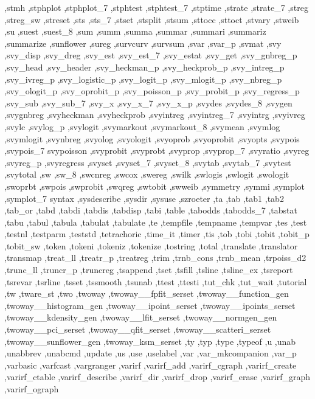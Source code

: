 {{    ,stmh ,stphplot ,stphplot_7 ,stphtest ,stphtest_7 ,stptime ,strate
    ,strate_7 ,streg ,streg_sw ,streset ,sts ,sts_7 ,stset ,stsplit
    ,stsum ,sttocc ,sttoct ,stvary ,stweib ,su ,suest ,suest_8 ,sum
    ,summ ,summa ,summar ,summari ,summariz ,summarize ,sunflower
    ,sureg ,survcurv ,survsum ,svar ,svar_p ,svmat ,svy ,svy_disp
    ,svy_dreg ,svy_est ,svy_est_7 ,svy_estat ,svy_get ,svy_gnbreg_p
    ,svy_head ,svy_header ,svy_heckman_p ,svy_heckprob_p ,svy_intreg_p
    ,svy_ivreg_p ,svy_logistic_p ,svy_logit_p ,svy_mlogit_p ,svy_nbreg_p
    ,svy_ologit_p ,svy_oprobit_p ,svy_poisson_p ,svy_probit_p
    ,svy_regress_p ,svy_sub ,svy_sub_7 ,svy_x ,svy_x_7 ,svy_x_p ,svydes
    ,svydes_8 ,svygen ,svygnbreg ,svyheckman ,svyheckprob ,svyintreg
    ,svyintreg_7 ,svyintrg ,svyivreg ,svylc ,svylog_p ,svylogit
    ,svymarkout ,svymarkout_8 ,svymean ,svymlog ,svymlogit ,svynbreg
    ,svyolog ,svyologit ,svyoprob ,svyoprobit ,svyopts ,svypois
    ,svypois_7 svypoisson ,svyprobit ,svyprobt ,svyprop ,svyprop_7
    ,svyratio ,svyreg ,svyreg_p ,svyregress ,svyset ,svyset_7 ,svyset_8
    ,svytab ,svytab_7 ,svytest ,svytotal ,sw ,sw_8 ,swcnreg ,swcox
    ,swereg ,swilk ,swlogis ,swlogit ,swologit ,swoprbt ,swpois
    ,swprobit ,swqreg ,swtobit ,swweib ,symmetry ,symmi ,symplot
    ,symplot_7 syntax ,sysdescribe ,sysdir ,sysuse ,szroeter ,ta ,tab
    ,tab1 ,tab2 ,tab_or ,tabd ,tabdi ,tabdis ,tabdisp ,tabi ,table
    ,tabodds ,tabodds_7 ,tabstat ,tabu ,tabul ,tabula ,tabulat ,tabulate
    ,te ,tempfile ,tempname ,tempvar ,tes ,test ,testnl ,testparm
    ,teststd ,tetrachoric ,time_it ,timer ,tis ,tob ,tobi ,tobit
    ,tobit_p ,tobit_sw ,token ,tokeni ,tokeniz ,tokenize ,tostring
    ,total ,translate ,translator ,transmap ,treat_ll ,treatr_p
    ,treatreg ,trim ,trnb_cons ,trnb_mean ,trpoiss_d2 ,trunc_ll
    ,truncr_p ,truncreg ,tsappend ,tset ,tsfill ,tsline ,tsline_ex
    ,tsreport ,tsrevar ,tsrline ,tsset ,tssmooth ,tsunab ,ttest
    ,ttesti ,tut_chk ,tut_wait ,tutorial ,tw ,tware_st ,two ,twoway
    ,twoway__fpfit_serset ,twoway__function_gen ,twoway__histogram_gen
    ,twoway__ipoint_serset ,twoway__ipoints_serset ,twoway__kdensity_gen
    ,twoway__lfit_serset ,twoway__normgen_gen ,twoway__pci_serset
    ,twoway__qfit_serset ,twoway__scatteri_serset ,twoway__sunflower_gen
    ,twoway_ksm_serset ,ty ,typ ,type ,typeof ,u ,unab ,unabbrev
    ,unabcmd ,update ,us ,use ,uselabel ,var ,var_mkcompanion
    ,var_p ,varbasic ,varfcast ,vargranger ,varirf ,varirf_add
    ,varirf_cgraph ,varirf_create ,varirf_ctable ,varirf_describe
    ,varirf_dir ,varirf_drop ,varirf_erase ,varirf_graph ,varirf_ograph
}}
